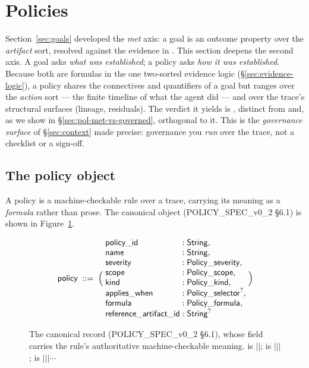\section{Policies}\label{sec:policies}

Section~\ref{sec:goals} developed the \emph{met} axis: a goal is an outcome
property over the \emph{artifact} sort, resolved against the evidence in \trace{}.
This section deepens the second axis. A goal asks \emph{what was established}; a
policy asks \emph{how it was established}. Because both are formulas in the one
two-sorted evidence logic (\S\ref{sec:evidence-logic}), a policy shares the
connectives and quantifiers of a goal but ranges over the \emph{action} sort ---
the finite timeline of what the agent did --- and over the trace's structural
surfaces (lineage, residuals). The verdict it yields is , distinct
from  and, as we show in \S\ref{sec:pol-met-vs-governed}, orthogonal to
it. This is the \emph{governance surface} of \S\ref{sec:context} made precise:
governance you \emph{run} over the trace, not a checklist or a sign-off.

\subsection{The policy object}\label{sec:pol-object}

A policy is a machine-checkable rule over a trace, carrying its meaning as a
\emph{formula} rather than prose. The canonical object (POLICY\_SPEC\_v0\_2
\S6.1) is shown in Figure~\ref{fig:pol-object}.

\begin{figure}[H]
\centering
\small
\[
\id{policy} \;::=\; \Big(\;
\begin{array}{@{}l@{\;:\;}l@{}}
\id{policy\_id}            & \id{String},\\
\id{name}                  & \id{String},\\
\id{severity}              & \id{Policy\_severity},\\
\id{scope}                 & \id{Policy\_scope},\\
\id{kind}                  & \id{Policy\_kind},\\
\id{applies\_when}         & \opt{\id{Policy\_selector}},\\
\id{formula}               & \id{Policy\_formula},\\
\id{reference\_artifact\_id} & \opt{\id{String}}
\end{array}
\;\Big)
\]
\caption{The canonical  record (POLICY\_SPEC\_v0\_2 \S6.1), whose  field carries the rule's authoritative machine-checkable meaning.  is $\mid$$\mid$;  is $\mid$$\mid$$\mid$;  is $\mid$$\mid$$\mid\cdots$}
\label{fig:pol-object}
\end{figure}

